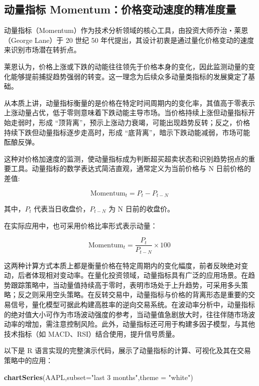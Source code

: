\documentclass[]{ctexbook}
\newenvironment{Shaded}{\begin{snugshade}}{\end{snugshade}}
\newcommand{\AttributeTok}[1]{\textcolor[rgb]{0.13,0.29,0.53}{#1}}
\newcommand{\FunctionTok}[1]{\textcolor[rgb]{0.13,0.29,0.53}{\textbf{#1}}}
\newcommand{\NormalTok}[1]{#1}
\newcommand{\StringTok}[1]{\textcolor[rgb]{0.31,0.60,0.02}{#1}}
\begin{document}
\subsection{动量指标 Momentum：价格变动速度的精准度量}\label{ux52a8ux91cfux6307ux6807-momentumux4ef7ux683cux53d8ux52a8ux901fux5ea6ux7684ux7cbeux51c6ux5ea6ux91cf}

动量指标（Momentum）作为技术分析领域的核心工具，由投资大师乔治・莱恩（George Lane）于 20 世纪 50 年代提出，其设计初衷是通过量化价格变动的速度来识别市场潜在转折点。

莱恩认为，价格上涨或下跌的动能往往领先于价格本身的变化，因此监测动量的变化能够提前捕捉趋势强弱的转变。这一理念为后续众多动量类指标的发展奠定了基础。

从本质上讲，动量指标衡量的是价格在特定时间周期内的变化率，其值高于零表示上涨动量占优，低于零则意味着下跌动能主导市场。当价格持续上涨但动量指标开始走弱时，形成 ``顶背离''，预示上涨动力衰竭，可能出现趋势反转；反之，价格持续下跌但动量指标逐步走高时，形成 ``底背离''，暗示下跌动能减弱，市场可能酝酿反弹。

这种对价格加速度的监测，使动量指标成为判断超买超卖状态和识别趋势拐点的重要工具。动量指标的数学表达式简洁直观，通常定义为当前价格与 N 日前价格的差值:

\[\text{Momentum}_t = P_t - P_{t-N}\]

其中，\(P_t\) 代表当日收盘价，\(P_{t-N}\) 为 N 日前的收盘价。

在实际应用中，也可采用价格比率形式表示动量：

\[
\text{Momentum}_t = \frac{P_t}{P_{t-N}} \times 100
\]

这两种计算方式本质上都是衡量价格在特定周期内的变化幅度，前者反映绝对变动，后者体现相对变动率。在量化投资领域，动量指标具有广泛的应用场景。在趋势跟踪策略中，当动量值持续高于零时，表明市场处于上升趋势，可采用多头策略；反之则采用空头策略。在反转交易中，动量指标与价格的背离形态是重要的交易信号，量化模型可据此构建高胜率的逆向交易系统。在波动率分析中，动量指标的绝对值大小可作为市场波动强度的参考，当动量值急剧放大时，往往伴随市场波动率的增加，需注意控制风险。此外，动量指标还可用于构建多因子模型，与其他技术指标（如 MACD、RSI）结合使用，提升信号质量。

以下是 R 语言实现的完整演示代码，展示了动量指标的计算、可视化及其在交易策略中的应用：

\begin{Shaded}
\begin{Highlighting}[]
\FunctionTok{chartSeries}\NormalTok{(AAPL,}\AttributeTok{subset=}\StringTok{"last 3 months"}\NormalTok{,}\AttributeTok{theme =} \StringTok{"white"}\NormalTok{)}
\end{Highlighting}
\end{Shaded}
\end{document}
